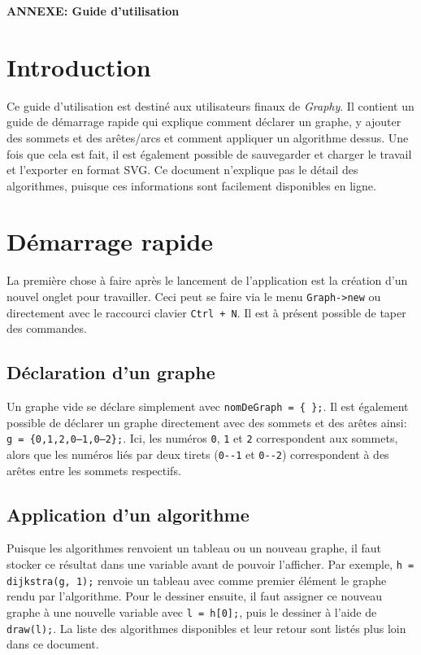 \documentclass[french]{article}
\begin{document}
	\centering
	\large{\textbf{ANNEXE: Guide d'utilisation}}
	
	\justifying
	\normalsize
	
	\section{Introduction}
	Ce guide d'utilisation est destiné aux utilisateurs finaux de \textit{Graphy}. Il contient un guide de démarrage rapide qui explique comment déclarer un graphe, y ajouter des sommets et des arêtes/arcs et comment appliquer un algorithme dessus. Une fois que cela est fait, il est également possible de sauvegarder et charger le travail et l'exporter en format SVG. Ce document n'explique pas le détail des algorithmes, puisque ces informations sont facilement disponibles en ligne.
	
	\section{Démarrage rapide}
	La première chose à faire après le lancement de l'application est la création d'un nouvel onglet pour travailler. Ceci peut se faire via le menu \texttt{Graph->new} ou directement avec le raccourci clavier \texttt{Ctrl + N}. Il est à présent possible de taper des commandes.
	
		\subsection{Déclaration d'un graphe}
		Un graphe vide se déclare simplement avec \texttt{nomDeGraph = \{ \};}. Il est également possible de déclarer un graphe directement avec des sommets et des arêtes ainsi: \texttt{g = \{0,1,2,0--1,0--2\};}. Ici, les numéros \texttt{0}, \texttt{1} et \texttt{2} correspondent aux sommets, alors que les numéros liés par deux tirets (\texttt{0-{}-1} et \texttt{0-{}-2}) correspondent à des arêtes entre les sommets respectifs.
		
		\subsection{Application d'un algorithme}
		Puisque les algorithmes renvoient un tableau ou un nouveau graphe, il faut stocker ce résultat dans une variable avant de pouvoir l'afficher. Par exemple, \texttt{h = dijkstra(g, 1);} renvoie un tableau avec comme premier élément le graphe rendu par l'algorithme. Pour le dessiner ensuite, il faut assigner ce nouveau graphe à une nouvelle variable avec \texttt{l = h[0];}, puis le dessiner à l'aide de \texttt{draw(l);}. La liste des algorithmes disponibles et leur retour sont listés plus loin dans ce document.
	
\end{document}
